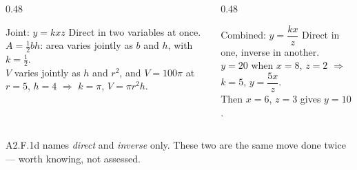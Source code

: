 \documentclass[aspectratio=169, 11pt]{beamer}
\begin{document}
\begin{frame}[t, plain]
  \begin{columns}[T]
    \begin{column}{0.48\textwidth}
      \begin{block}{Joint: $y=kxz$}
        Direct in two variables at once. \\[4pt]
        $A=\frac12 bh$: area varies jointly as $b$ and $h$, with $k=\frac12$. \\[4pt]
        $V$ varies jointly as $h$ and $r^2$, and $V=100\pi$ at $r=5$, $h=4$ \; $\Rightarrow$ \;
        $k=\pi$, \; $V=\pi r^2h$.
      \end{block}
    \end{column}
    \begin{column}{0.48\textwidth}
      \begin{block}{Combined: $y=\dfrac{kx}{z}$}
        Direct in one, inverse in another. \\[4pt]
        $y=20$ when $x=8$, $z=2$ \; $\Rightarrow$ \; $k=5$, \; $y=\dfrac{5x}{z}$. \\[4pt]
        Then $x=6$, $z=3$ gives $y=10$.
      \end{block}
    \end{column}
  \end{columns}
  \vspace{6pt}
  \begin{block}{}
    \centering A2.F.1d names \emph{direct} and \emph{inverse} only. These two are the same move done
    twice --- worth knowing, not assessed.
  \end{block}
\end{frame}
\end{document}
